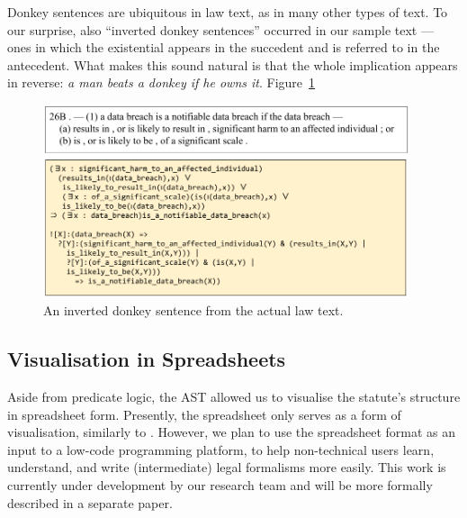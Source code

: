 \documentclass{IOS-Book-Article}
\begin{document}
Donkey sentences are ubiquitous in law text, as in many other types of text.
To our surprise, also ``inverted donkey sentences'' occurred in our sample text --- ones in which the existential appears in the succedent and is referred to in the antecedent.
What makes this sound natural is that the whole implication appears in reverse: \textit{a man beats a donkey if he owns it}.
Figure~\ref{donkey}

\begin{figure}
 \includegraphics[width=0.96\textwidth]{anaphora.png}
\caption{An inverted donkey sentence from the actual law text.}
\label{donkey}
\end{figure}

\subsection{Visualisation in Spreadsheets}

Aside from predicate logic, the AST allowed us to visualise the statute's structure in spreadsheet form.
Presently, the spreadsheet only serves as a form of visualisation, similarly to \cite{mochales_study_2008}.
However, we plan to use the spreadsheet format as an input to a low-code programming platform,
to help non-technical users learn, understand, and write (intermediate) legal formalisms more easily.
This work is currently under development by our research team and will be more formally described in a separate paper.
\end{document}
